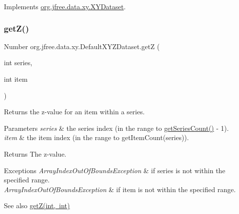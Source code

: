 Implements \mbox{\hyperlink{interfaceorg_1_1jfree_1_1data_1_1xy_1_1_x_y_dataset_a5e86389417eb5ed7b663a952ca370914}{org.\+jfree.\+data.\+xy.\+X\+Y\+Dataset}}.

\mbox{\label{classorg_1_1jfree_1_1data_1_1xy_1_1_default_x_y_z_dataset_a9d64059ab691a5d4e2de1ba1e70bb02e}} 
\subsubsection{\texorpdfstring{get\+Z()}{getZ()}}
{\footnotesize\ttfamily Number org.\+jfree.\+data.\+xy.\+Default\+X\+Y\+Z\+Dataset.\+getZ (\begin{DoxyParamCaption}\item[{int}]{series,  }\item[{int}]{item }\end{DoxyParamCaption})}

Returns the z-\/value for an item within a series.


\begin{DoxyParams}{Parameters}
{\em series} & the series index (in the range {} to {\ttfamily \mbox{\hyperlink{classorg_1_1jfree_1_1data_1_1xy_1_1_default_x_y_z_dataset_a115138a06afdc19d3526ef73fabf578e}{get\+Series\+Count()}} -\/ 1}). \\
\hline
{\em item} & the item index (in the range {} to {\ttfamily get\+Item\+Count(series)}).\\
\hline
\end{DoxyParams}
\begin{DoxyReturn}{Returns}
The z-\/value.
\end{DoxyReturn}

\begin{DoxyExceptions}{Exceptions}
{\em Array\+Index\+Out\+Of\+Bounds\+Exception} & if {\ttfamily series} is not within the specified range. \\
\hline
{\em Array\+Index\+Out\+Of\+Bounds\+Exception} & if {\ttfamily item} is not within the specified range.\\
\hline
\end{DoxyExceptions}
\begin{DoxySeeAlso}{See also}
\mbox{\hyperlink{classorg_1_1jfree_1_1data_1_1xy_1_1_default_x_y_z_dataset_a9d64059ab691a5d4e2de1ba1e70bb02e}{get\+Z(int, int)}} 
\end{DoxySeeAlso}


